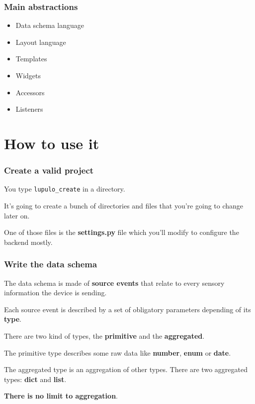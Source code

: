 \documentclass{beamer}
\begin{document}
    \begin{frame}
        \frametitle{Main abstractions}
        \begin{itemize}
            \item Data schema language
            \item Layout language
            \item Templates
            \item Widgets
            \item Accessors
            \item Listeners
        \end{itemize}
    \end{frame}

    \section{How to use it}
    \begin{frame}
        \frametitle{Create a valid project}
        You type \texttt{lupulo\_create} in a directory.

        It's going to create a bunch of directories and files that you're going
        to change later on.

        One of those files is the \textbf{settings.py} file which you'll modify
        to configure the backend mostly.
    \end{frame}

    \begin{frame}
        \frametitle{Write the data schema}

        The data schema is made of \textbf{source events} that relate to every
        sensory information the device is sending.

        Each source event is described by a set of obligatory parameters
        depending of its \textbf{type}.

        There are two kind of types, the \textbf{primitive} and the
        \textbf{aggregated}.

        The primitive type describes some raw data like \textbf{number}, 
        \textbf{enum} or \textbf{date}.

        The aggregated type is an aggregation of other types. There are two
        aggregated types: \textbf{dict} and \textbf{list}.

        \textbf{There is no limit to aggregation}.
    \end{frame}
\end{document}
